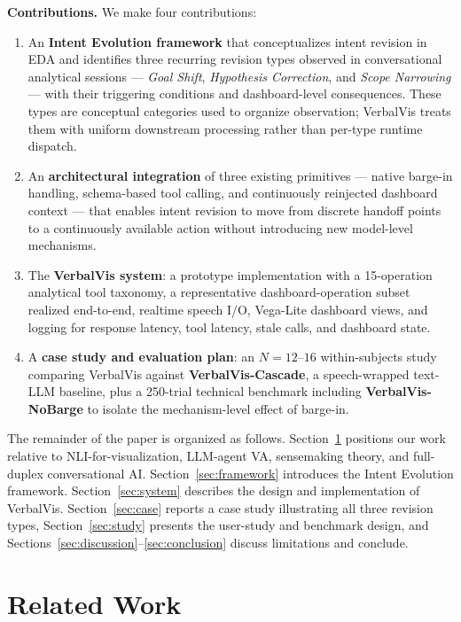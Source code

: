 \documentclass[journal]{IEEEtran}
\begin{document}
\textbf{Contributions.} We make four contributions:
\begin{enumerate}
\item An \textbf{Intent Evolution framework} that conceptualizes intent revision in EDA and identifies three recurring revision types observed in conversational analytical sessions --- \emph{Goal Shift}, \emph{Hypothesis Correction}, and \emph{Scope Narrowing} --- with their triggering conditions and dashboard-level consequences. These types are conceptual categories used to organize observation; VerbalVis treats them with uniform downstream processing rather than per-type runtime dispatch.
\item An \textbf{architectural integration} of three existing primitives --- native barge-in handling, schema-based tool calling, and continuously reinjected dashboard context --- that enables intent revision to move from discrete handoff points to a continuously available action without introducing new model-level mechanisms.
\item The \textbf{VerbalVis system}: a prototype implementation with a 15-operation analytical tool taxonomy, a representative dashboard-operation subset realized end-to-end, realtime speech I/O, Vega-Lite dashboard views, and logging for response latency, tool latency, stale calls, and dashboard state.
\item A \textbf{case study and evaluation plan}: an $N{=}12$--$16$ within-subjects study comparing VerbalVis against \textbf{VerbalVis-Cascade}, a speech-wrapped text-LLM baseline, plus a 250-trial technical benchmark including \textbf{VerbalVis-NoBarge} to isolate the mechanism-level effect of barge-in.
\end{enumerate}

The remainder of the paper is organized as follows. Section~\ref{sec:related} positions our work relative to NLI-for-visualization, LLM-agent VA, sensemaking theory, and full-duplex conversational AI. Section~\ref{sec:framework} introduces the Intent Evolution framework. Section~\ref{sec:system} describes the design and implementation of VerbalVis. Section~\ref{sec:case} reports a case study illustrating all three revision types, Section~\ref{sec:study} presents the user-study and benchmark design, and Sections~\ref{sec:discussion}--\ref{sec:conclusion} discuss limitations and conclude.

\section{Related Work}
\label{sec:related}
\end{document}
